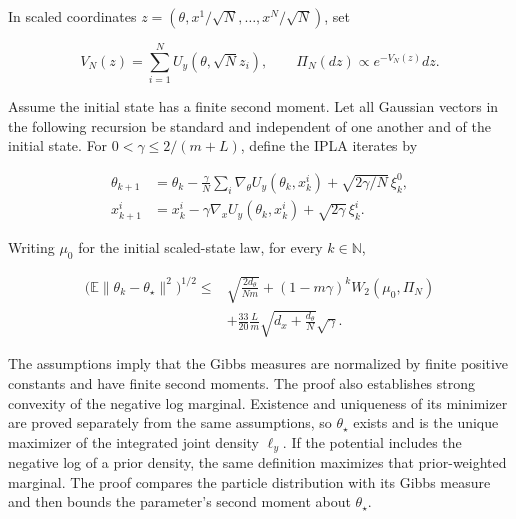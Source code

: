 \documentclass[11pt,a4paper]{report}
\begin{document}
In scaled coordinates \(z=(\theta,x^1/\sqrt N,\ldots,x^N/\sqrt N)\), set


\[V_N(z)=\sum_{i=1}^NU_y(\theta,\sqrt N z_i),\qquad
\Pi_N(dz)\propto e^{-V_N(z)}dz.\]


Assume the initial state has a finite second moment. Let all Gaussian vectors in the following recursion be standard and independent of one another and of the initial state. For \(0<\gamma\le2/(m+L)\), define the IPLA iterates by


\[\begin{aligned}
\theta_{k+1}&=\theta_k-\frac\gamma N\sum_i\nabla_\theta U_y(\theta_k,x_k^i)+\sqrt{2\gamma/N}\,\xi_k^0,\\
x_{k+1}^i&=x_k^i-\gamma\nabla_xU_y(\theta_k,x_k^i)+\sqrt{2\gamma}\,\xi_k^i.
\end{aligned}\]


Writing \(\mu_0\) for the initial scaled-state law, for every \(k\in\mathbb N\),


\[\begin{aligned}
\bigl(\mathbb E\|\theta_k-\theta_\star\|^2\bigr)^{1/2}
\le{}&\sqrt{\frac{2d_\theta}{Nm}}+(1-m\gamma)^kW_2(\mu_0,\Pi_N)\\
&+\frac{33}{20}\frac Lm\sqrt{d_x+\frac{d_\theta}{N}}\sqrt\gamma.
\end{aligned}\]


The assumptions imply that the Gibbs measures are normalized by finite positive constants and have finite second moments. The proof also establishes strong convexity of the negative log marginal. Existence and uniqueness of its minimizer are proved separately from the same assumptions, so \(\theta_\star\) exists and is the unique maximizer of the integrated joint density \(\ell_y\). If the potential includes the negative log of a prior density, the same definition maximizes that prior-weighted marginal. The proof compares the particle distribution with its Gibbs measure and then bounds the parameter's second moment about \(\theta_\star\).
\end{document}
